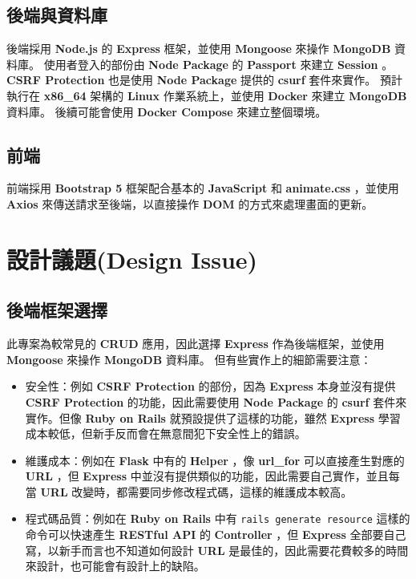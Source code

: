 \documentclass{article}
\begin{document}
\bigskip

\subsection{後端與資料庫}

後端採用 \textbf{Node.js} 的 \textbf{Express} 框架，並使用 \textbf{Mongoose} 來操作 \textbf{MongoDB} 資料庫。
使用者登入的部份由 \textbf{Node Package} 的 \textbf{Passport} 來建立 \textbf{Session} 。
\textbf{CSRF Protection} 也是使用 \textbf{Node Package} 提供的 \textbf{csurf} 套件來實作。
預計執行在 \textbf{x86\_64} 架構的 \textbf{Linux} 作業系統上，並使用 \textbf{Docker} 來建立 \textbf{MongoDB} 資料庫。
後續可能會使用 \textbf{Docker Compose} 來建立整個環境。

\subsection{前端}

前端採用 \textbf{Bootstrap 5} 框架配合基本的 \textbf{JavaScript} 和 \textbf{animate.css} ，並使用 \textbf{Axios} 來傳送請求至後端，以直接操作 \textbf{DOM} 的方式來處理畫面的更新。

\newpage

\section[設計議題(DESIGN ISSUE)]{設計議題(Design Issue)}

\subsection{後端框架選擇}

此專案為較常見的 \textbf{CRUD} 應用，因此選擇 \textbf{Express} 作為後端框架，並使用 \textbf{Mongoose} 來操作 \textbf{MongoDB} 資料庫。
但有些實作上的細節需要注意：

\begin{itemize}
	\item 安全性：例如 \textbf{CSRF Protection} 的部份，因為 \textbf{Express} 本身並沒有提供 \textbf{CSRF Protection} 的功能，因此需要使用 \textbf{Node Package} 的 \textbf{csurf} 套件來實作。但像 \textbf{Ruby on Rails} 就預設提供了這樣的功能，雖然 \textbf{Express} 學習成本較低，但新手反而會在無意間犯下安全性上的錯誤。
	\item 維護成本：例如在 \textbf{Flask} 中有的 \textbf{Helper} ，像 \textbf{url\_for} 可以直接產生對應的 \textbf{URL} ，但 \textbf{Express} 中並沒有提供類似的功能，因此需要自己實作，並且每當 \textbf{URL} 改變時，都需要同步修改程式碼，這樣的維護成本較高。
	\item 程式碼品質：例如在 \textbf{Ruby on Rails} 中有 \verb|rails generate resource| 這樣的命令可以快速產生 \textbf{RESTful API} 的 \textbf{Controller} ，但 \textbf{Express} 全部要自己寫，以新手而言也不知道如何設計 \textbf{URL} 是最佳的，因此需要花費較多的時間來設計，也可能會有設計上的缺陷。
\end{itemize}
\end{document}
